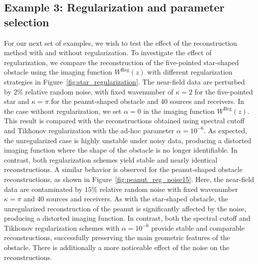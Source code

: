 \documentclass{article}
\begin{document}
\subsection{Example 3: Regularization and parameter selection}
For our next set of examples, we wish to test the effect of the reconstruction method with and without regularization. To investigate the effect of regularization, we compare the reconstruction of the five-pointed star-shaped obstacle using the imaging function $W^{\mathrm{Reg}}(z)$ with different regularization strategies in Figure~\ref{fig:star_regularization}. The near-field data are perturbed by $2\%$ relative random noise, with fixed wavenumber of $\kappa=2$ for the five-pointed star and $\kappa=\pi$ for the peanut-shaped obstacle and $40$ sources and receivers. In the case without regularization, we set $\alpha=0$ in the imaging function
$W^{\mathrm{Reg}}(z)$. This result is compared with the reconstructions obtained
using spectral cutoff and Tikhonov regularization with the ad-hoc parameter
$\alpha=10^{-6}$. As expected, the unregularized case is highly unstable under noisy data, producing a distorted imaging function where the shape of the obstacle is no longer identifiable. In contrast, both regularization schemes yield stable and nearly identical reconstructions. A similar behavior is observed for the peanut-shaped obstacle reconstructions, as shown in Figure~\ref{fig:peanut_reg_noise15}. Here, the near-field data are contaminated by $15\%$ relative random noise with fixed wavenumber $\kappa=\pi$ and $40$ sources and receivers. As with the star-shaped obstacle, the unregularized reconstruction of the peanut is significantly affected by the noise, producing a distorted imaging function. In contrast, both the spectral cutoff and Tikhonov regularization schemes with $\alpha=10^{-6}$ provide stable and comparable reconstructions, successfully preserving the main geometric features of the obstacle. There is additionally a more noticeable effect of the noise on the reconstructions. 
\end{document}
